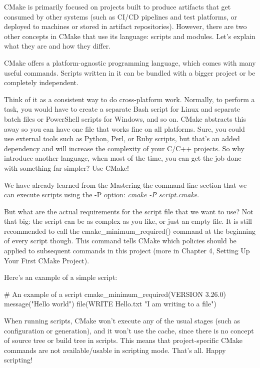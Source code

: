 CMake is primarily focused on projects built to produce artifacts that get consumed by other systems (such as CI/CD pipelines and test platforms, or deployed to machines or stored in artifact repositories). However, there are two other concepts in CMake that use its language: scripts and modules. Let’s explain what they are and how they differ.



CMake offers a platform-agnostic programming language, which comes with many useful commands. Scripts written in it can be bundled with a bigger project or be completely independent.

Think of it as a consistent way to do cross-platform work. Normally, to perform a task, you would have to create a separate Bash script for Linux and separate batch files or PowerShell scripts for Windows, and so on. CMake abstracts this away so you can have one file that works fine on all platforms. Sure, you could use external tools such as Python, Perl, or Ruby scripts, but that’s an added dependency and will increase the complexity of your C/C++ projects. So why introduce another language, when most of the time, you can get the job done with something far simpler? Use CMake!

We have already learned from the Mastering the command line section that we can execute scripts using the -P option: \textit{cmake -P script.cmake}.

But what are the actual requirements for the script file that we want to use? Not that big: the script can be as complex as you like, or just an empty file. It is still recommended to call the cmake\_minimum\_required() command at the beginning of every script though. This command tells CMake which policies should be applied to subsequent commands in this project (more in Chapter 4, Setting Up Your First CMake Project).

Here’s an example of a simple script:


\begin{cmake}
# An example of a script
cmake_minimum_required(VERSION 3.26.0)
message("Hello world")
file(WRITE Hello.txt "I am writing to a file")
\end{cmake}

When running scripts, CMake won’t execute any of the usual stages (such as configuration or generation), and it won’t use the cache, since there is no concept of source tree or build tree in scripts. This means that project-specific CMake commands are not available/usable in scripting mode. That’s all. Happy scripting!

